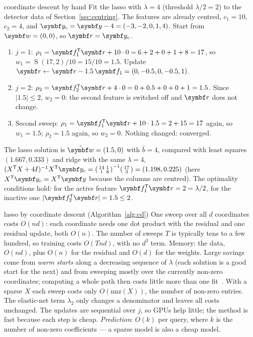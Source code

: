 \documentclass[11pt]{article}
\newcommand{\w}{\vect{w}}
\newcommand{\y}{\vect{y}}
\newcommand{\soft}{\operatorname{S}}
\newcommand{\vr}{\vect{r}}
\begin{document}
\begin{worked}{coordinate descent by hand}
Fit the lasso with $\lambda = 4$ (threshold $\lambda/2 = 2$) to the detector data of Section~\ref{sec:centring}. The
features are already centred, $c_1 = 10$, $c_2 = 4$, and $\y_c = \y - 4 = (-3, -2, 0, 1, 4)$. Start from $\w = (0, 0)$,
so $\vr = \y_c$.
\begin{enumerate}[label=\arabic*.,leftmargin=1.6em]
\item $j = 1$: $\rho_1 = \vect{f}_1\T\vr + 10 \cdot 0 = 6 + 2 + 0 + 1 + 8 = 17$, so $w_1 = \soft(17, 2)/10 = 15/10 = 1.5$.
Update $\vr \gets \vr - 1.5\,\vect{f}_1 = (0, -0.5, 0, -0.5, 1)$.
\item $j = 2$: $\rho_2 = \vect{f}_2\T\vr + 4 \cdot 0 = 0 + 0.5 + 0 + 0 + 1 = 1.5$. Since $|1.5| \le 2$, $w_2 = 0$: the second
feature is switched off and $\vr$ does not change.
\item Second sweep: $\rho_1 = \vect{f}_1\T\vr + 10 \cdot 1.5 = 2 + 15 = 17$ again, so $w_1 = 1.5$; $\rho_2 = 1.5$ again,
so $w_2 = 0$. Nothing changed: converged.
\end{enumerate}
The lasso solution is $\hat{\w} = (1.5, 0)$ with $\hat b = 4$, compared with least squares $(1.667, 0.333)$ and ridge
with the same $\lambda = 4$, $(X\T X + 4I)^{-1}X\T\y_c = \begin{psmallmatrix} 14 & 1 \\ 1 & 8 \end{psmallmatrix}^{-1}
\begin{psmallmatrix} 17 \\ 3 \end{psmallmatrix} = (1.198, 0.225)$ (here $X\T\y_c = X\T\y$ because the columns are centred). The optimality conditions hold: for the active
feature $\vect{f}_1\T\vr = 2 = \lambda/2$, for the inactive one $|\vect{f}_2\T\vr| = 1.5 \le 2$.
\end{worked}

\begin{runtime}{lasso by coordinate descent (Algorithm~\ref{alg:cd})}
One sweep over all $d$ coordinates costs $O(nd)$: each coordinate needs one dot product with the residual and one
residual update, both $O(n)$. The number of sweeps $T$ is typically tens to a few hundred, so training costs $O(Tnd)$,
with no $d^3$ term. Memory: the data, $O(nd)$, plus $O(n)$ for the residual and $O(d)$ for the weights. Large savings
come from \emph{warm starts} along a decreasing sequence of $\lambda$ (each solution is a good start for the next) and
from sweeping mostly over the currently non-zero coordinates; computing a whole path then costs little more than one
fit~\cite{friedman2010}. With a sparse $X$ each sweep costs only $O(\mathrm{nnz}(X))$, the number of non-zero
entries. The elastic-net term $\lambda_2$ only changes a denominator and leaves all costs unchanged. The updates are
sequential over $j$, so GPUs help little; the method is fast because each step is cheap.
\emph{Prediction}: $O(k)$ per query, where $k$ is the number of non-zero coefficients --- a sparse model is also a cheap model.
\end{runtime}
\end{document}
